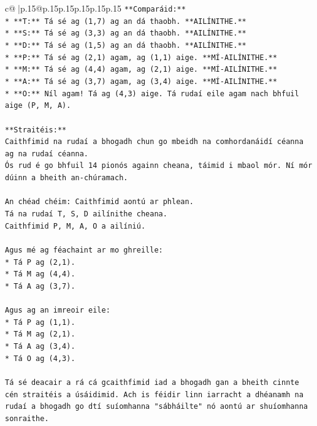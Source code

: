 \documentclass{article}
\begin{document}
{\begin{supertabular}{c@{$\;$}|p{.15\linewidth}@{}p{.15\linewidth}p{.15\linewidth}p{.15\linewidth}p{.15\linewidth}p{.15\linewidth}}
{{{\texttt{**Comparáid:**} \\
\texttt{*   **T:** Tá sé ag (1,7) ag an dá thaobh. **AILÍNITHE.**} \\
\texttt{*   **S:** Tá sé ag (3,3) ag an dá thaobh. **AILÍNITHE.**} \\
\texttt{*   **D:** Tá sé ag (1,5) ag an dá thaobh. **AILÍNITHE.**} \\
\texttt{*   **P:** Tá sé ag (2,1) agam, ag (1,1) aige. **MÍ{-}AILÍNITHE.**} \\
\texttt{*   **M:** Tá sé ag (4,4) agam, ag (2,1) aige. **MÍ{-}AILÍNITHE.**} \\
\texttt{*   **A:** Tá sé ag (3,7) agam, ag (3,4) aige. **MÍ{-}AILÍNITHE.**} \\
\texttt{*   **O:** Níl agam! Tá ag (4,3) aige. Tá rudaí eile agam nach bhfuil aige (P, M, A).} \\
\\ 
\texttt{**Straitéis:**} \\
\texttt{Caithfimid na rudaí a bhogadh chun go mbeidh na comhordanáidí céanna ag na rudaí céanna.} \\
\texttt{Ós rud é go bhfuil 14 pionós againn cheana, táimid i mbaol mór. Ní mór dúinn a bheith an{-}chúramach.} \\
\\ 
\texttt{An chéad chéim: Caithfimid aontú ar phlean.} \\
\texttt{Tá na rudaí T, S, D ailínithe cheana.} \\
\texttt{Caithfimid P, M, A, O a ailíniú.} \\
\\ 
\texttt{Agus mé ag féachaint ar mo ghreille:} \\
\texttt{*   Tá P ag (2,1).} \\
\texttt{*   Tá M ag (4,4).} \\
\texttt{*   Tá A ag (3,7).} \\
\\ 
\texttt{Agus ag an imreoir eile:} \\
\texttt{*   Tá P ag (1,1).} \\
\texttt{*   Tá M ag (2,1).} \\
\texttt{*   Tá A ag (3,4).} \\
\texttt{*   Tá O ag (4,3).} \\
\\ 
\texttt{Tá sé deacair a rá cá gcaithfimid iad a bhogadh gan a bheith cinnte cén straitéis a úsáidimid. Ach is féidir linn iarracht a dhéanamh na rudaí a bhogadh go dtí suíomhanna "sábháilte" nó aontú ar shuíomhanna sonraithe.} \\
}}}
\end{supertabular}}
\end{document}
